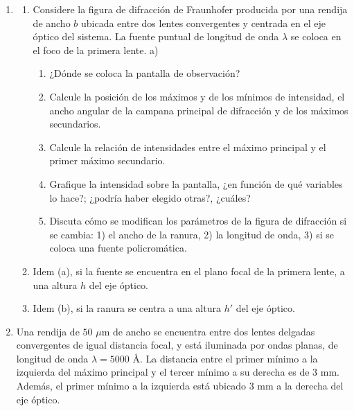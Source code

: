 \documentclass[11pt,spanish]{article}
\begin{document}
\begin{enumerate}


\section*{Rendija simple}


    \item 
    \begin{enumerate}
        \item Considere la figura de difracción de Fraunhofer producida por una
        rendija de ancho $b$ ubicada entre dos lentes convergentes y centrada
        en el eje óptico del sistema. La fuente puntual de longitud de onda
        $\lambda$ se coloca en el foco de la primera lente. a) 
        
        \begin{enumerate}
            \item ¿Dónde se coloca la pantalla de observación?
            \item Calcule la posición de los máximos y de los mínimos de intensidad,
            el ancho angular de la campana principal de difracción y de los máximos
            secundarios. 
            \item Calcule la relación de intensidades entre el máximo principal y el
            primer máximo secundario. 
            \item Grafique la intensidad sobre la pantalla, ¿en función de qué variables
            lo hace?; ¿podría haber elegido otras?, ¿cuáles?
            \item Discuta cómo se modifican los parámetros de la figura de difracción
            si se cambia: 1) el ancho de la ranura, 2) la longitud de onda, 3)
            si se coloca una fuente policromática. 
        \end{enumerate}
        
        \item Idem (a), si la fuente se encuentra en el plano focal de la primera
        lente, a una altura $h$ del eje óptico. 
        
        \item Idem (b), si la ranura se centra a una altura $h'$ del eje óptico. 
    \end{enumerate}


    \item Una rendija de $50$ $\mu$m de ancho se encuentra entre dos lentes
    delgadas convergentes de igual distancia focal, y está iluminada por
    ondas planas, de longitud de onda $\lambda=5000$ Å. La distancia
    entre el primer mínimo a la izquierda del máximo principal y el tercer
    mínimo a su derecha es de $3$ mm. Además, el primer mínimo a la izquierda
    está ubicado $3$ mm a la derecha del eje óptico.
    

\end{enumerate}
\end{document}
